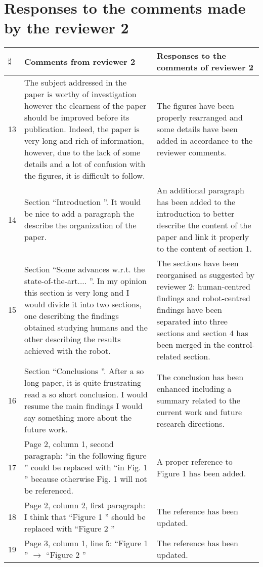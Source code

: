 \documentclass[12pt,a4paper]{article}
\begin{document}
\section{Responses to the comments made by the reviewer 2}

\hspace{-0.5cm}
\begin{longtable}[!h]{|p{0.3cm}|p{8.5cm}||p{9cm}|}
\hline
$\sharp$ & Comments from reviewer 2 & Responses to the comments of reviewer 2\tabularnewline  \hline \hline		
13 & The subject addressed in the paper is worthy of investigation however the clearness of the paper should be improved before its publication. Indeed, the paper is very long and rich of information, however, due to the lack of some details and a lot of confusion with the figures, it is difficult to follow. & The figures have been properly rearranged and some details have been added in accordance to the reviewer comments.\tabularnewline \hline
14 & Section  ``Introduction ''. It would be nice to add a paragraph the describe the organization of the paper. & An additional paragraph has been added to the introduction to better describe the content of the paper and link it properly to the content of section 1. \tabularnewline \hline
15 &	 Section  ``Some advances w.r.t. the state-of-the-art.... ''. In my opinion this section is very long and I would divide it into two sections, one describing the findings obtained studying humans and the other describing the results achieved with the robot. & The sections have been reorganised as suggested by reviewer 2: human-centred findings and robot-centred findings have been separated into three sections and section 4 has been merged in the control-related section.\tabularnewline \hline
16 & 	Section  ``Conclusions ''. After a so long paper, it is quite frustrating read a so short conclusion. I would resume the main findings I would say something more about the future work. & The conclusion has been enhanced including a summary related to the current work and future research directions.\tabularnewline \hline
17 & Page 2, column 1, second paragraph:  ``in the following figure '' could be replaced with  ``in Fig. 1 '' because otherwise Fig. 1 will not be referenced. & A proper reference to Figure 1 has been added.\tabularnewline \hline
18	& Page 2, column 2, first paragraph: I think that  ``Figure 1 '' should be replaced with  ``Figure 2 '' & The reference has been updated.\tabularnewline \hline
19	& Page 3, column 1, line 5:  ``Figure 1 '' $\rightarrow$  ``Figure 2 '' & The reference has been updated.\tabularnewline \hline

\end{longtable}
\end{document}
